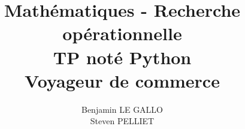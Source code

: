 \documentclass[a4paper,10pt]{report}
\title{Mathématiques - Recherche opérationnelle \\
TP noté Python \\
\textbf{Voyageur de commerce}}
\author{Benjamin LE GALLO \\
Steven PELLIET}
\begin{document}
\maketitle

\begin{abstract}
\end{abstract}
\end{document}
